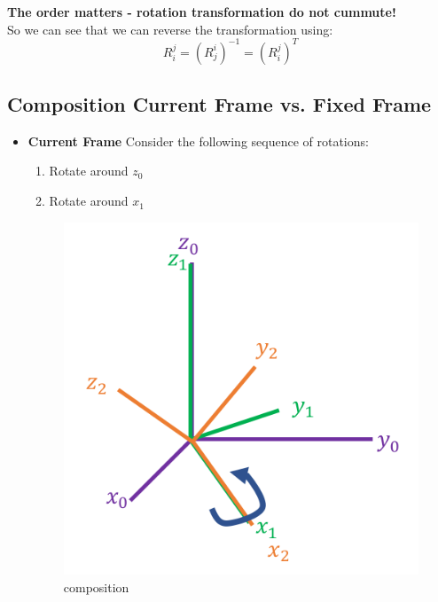 \documentclass{article}
\begin{document}
\textbf{The order matters - rotation transformation do not cummute!}\\

So we can see that we can reverse the transformation using:
$$R^{j}_{i}=(R^{i}_{j})^{-1}=(R^{j}_{i})^{T} $$

\subsection{Composition Current Frame vs. Fixed Frame}
\begin{itemize}
    \item \textbf{Current Frame} Consider the following sequence of rotations:
    \begin{enumerate}
        \item Rotate around $z_0$
        \item Rotate around $x_1$
    \end{enumerate}
    \begin{figure}[h!]
    \centering
    \includegraphics[scale=1.5]{currentFrame.png}
    \caption{composition}
    \label{fig:sr}
    \end{figure}


\end{itemize}
\end{document}
